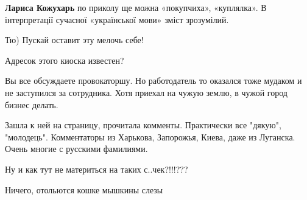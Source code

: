 \begin{itemize}
\begin{itemize}
\textbf{Лариса Кожухарь} по приколу ще можна «покупчиха», «куплялка». В інтерпретації сучасної «української мови» зміст зрозумілий.
\end{itemize}

 
Тю) Пускай оставит эту мелочь себе!

 
Адресок этого киоска известен?

Вы все обсуждаете провокаторшу. Но работодатель то оказался тоже мудаком и не
заступился за сотрудника. Хотя приехал на чужую землю, в чужой город бизнес
делать.


 

Зашла к ней на страницу, прочитала комменты. Практически все "дякую",
"молодець". Комментаторы из Харькова, Запорожья, Киева, даже из Луганска. Очень
многие с русскими фамилиями.


 
Ну и как тут не материться на таких с..чек?!!!???

 
Ничего, отольются кошке мышкины слезы

 

\end{itemize}
